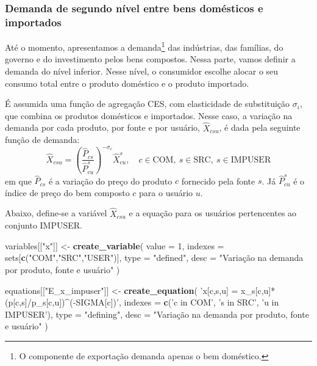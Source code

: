\documentclass[12pt,twoside]{article}
\newenvironment{Shaded}{\begin{snugshade}}{\end{snugshade}}
\newcommand{\DataTypeTok}[1]{\textcolor[rgb]{0.13,0.29,0.53}{#1}}
\newcommand{\DecValTok}[1]{\textcolor[rgb]{0.00,0.00,0.81}{#1}}
\newcommand{\KeywordTok}[1]{\textcolor[rgb]{0.13,0.29,0.53}{\textbf{#1}}}
\newcommand{\NormalTok}[1]{#1}
\newcommand{\StringTok}[1]{\textcolor[rgb]{0.31,0.60,0.02}{#1}}
\let\oldShaded\Shaded
\let\endoldShaded\endShaded
\renewenvironment{Shaded}{\footnotesize\oldShaded}{\endoldShaded}
\let\rmarkdownfootnote\footnote%
\def\footnote{\protect\rmarkdownfootnote}
\begin{document}
\hypertarget{demanda-de-segundo-nuxedvel-entre-bens-domuxe9sticos-e-importados}{%
\subsubsection{Demanda de segundo nível entre bens domésticos e
importados}\label{demanda-de-segundo-nuxedvel-entre-bens-domuxe9sticos-e-importados}}

Até o momento, apresentamos a demanda\footnote{O componente de
  exportação demanda apenas o bem doméstico.} das indústrias, das
famílias, do governo e do investimento pelos bens compostos. Nessa
parte, vamos definir a demanda do nível inferior. Nesse nível, o
consumidor escolhe alocar o seu consumo total entre o produto doméstico
e o produto importado.

É assumida uma função de agregação CES, com elasticidade de substituição
\(\sigma_i\), que combina os produtos domésticos e importados. Nesse
caso, a variação na demanda por cada produto, por fonte e por usuário,
\(\hat{X}_{csu}\), é dada pela seguinte função de demanda:
\begin{equation}\label{e_x}
\hat{X}_{csu} = \left(\frac{\hat{P}_{cs}}{\hat{P}^s_{cu}}\right)^{-\sigma_c} \hat{X}^s_{cu}, \quad c \in \text{COM},~s \in \text{SRC},~s \in \text{IMPUSER}
\end{equation} em que \(\hat{P}_{cs}\) é a variação do preço do produto
\(c\) fornecido pela fonte \(s\). Já \(\hat{P}^s_{cu}\) é o índice de
preço do bem composto \(c\) para o usuário \(u\).

Abaixo, define-se a variável \(\hat{X}_{csu}\) e a equação para os
usuários pertencentes ao conjunto IMPUSER.

\begin{Shaded}
\begin{Highlighting}[]
\NormalTok{variables[[}\StringTok{"x"}\NormalTok{]] <-}\StringTok{ }\KeywordTok{create_variable}\NormalTok{(}
  \DataTypeTok{value =} \DecValTok{1}\NormalTok{,}
  \DataTypeTok{indexes =}\NormalTok{ sets[}\KeywordTok{c}\NormalTok{(}\StringTok{"COM"}\NormalTok{,}\StringTok{"SRC"}\NormalTok{,}\StringTok{"USER"}\NormalTok{)],}
  \DataTypeTok{type =} \StringTok{"defined"}\NormalTok{,}
  \DataTypeTok{desc =} \StringTok{"Variação na demanda por produto, fonte e usuário"}
\NormalTok{)}

\NormalTok{equations[[}\StringTok{"E_x_impuser"}\NormalTok{]] <-}\StringTok{ }\KeywordTok{create_equation}\NormalTok{(}
  \StringTok{'x[c,s,u] = x_s[c,u]*(p[c,s]/p_s[c,u])^(-SIGMA[c])'}\NormalTok{,}
  \DataTypeTok{indexes =} \KeywordTok{c}\NormalTok{(}\StringTok{'c in COM'}\NormalTok{, }\StringTok{'s in SRC'}\NormalTok{, }\StringTok{'u in IMPUSER'}\NormalTok{),}
  \DataTypeTok{type =} \StringTok{"defining"}\NormalTok{,}
  \DataTypeTok{desc =} \StringTok{"Variação na demanda por produto, fonte e usuário"}
\NormalTok{)}
\end{Highlighting}
\end{Shaded}
\end{document}
